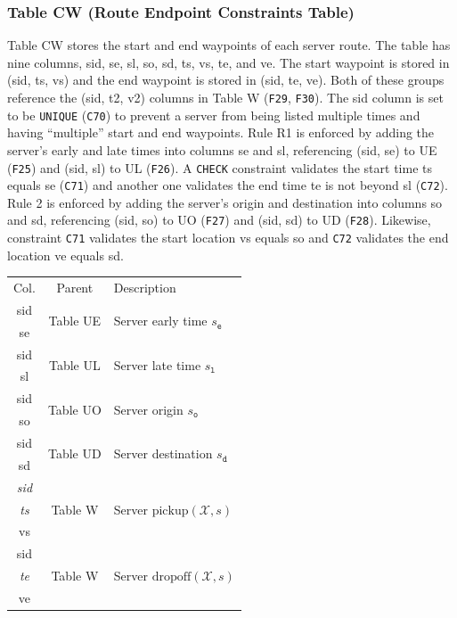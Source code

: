 \documentclass{article}
\theoremstyle{definition}
\begin{document}
\subsubsection{Table CW (Route Endpoint Constraints Table)}
Table CW stores the start and end waypoints of each server route.  The table
has nine columns, \textsf{sid}, \textsf{se}, \textsf{sl}, \textsf{so},
\textsf{sd}, \textsf{ts}, \textsf{vs}, \textsf{te}, and \textsf{ve}.  The start
waypoint is stored in (\textsf{sid}, \textsf{ts}, \textsf{vs}) and the end
waypoint is stored in (\textsf{sid}, \textsf{te}, \textsf{ve}). Both of these
groups reference the (\textsf{sid}, \textsf{t2}, \textsf{v2}) columns in Table
W ({\tt{}F29}, {\tt{}F30}).  The \textsf{sid} column is set to be \texttt{UNIQUE}
({\tt{}C70}) to prevent a server from being listed multiple times and having
``multiple'' start and end waypoints.  Rule R1 is enforced by adding the
server's early and late times into columns \textsf{se} and \textsf{sl},
referencing (\textsf{sid}, \textsf{se}) to UE ({\tt{}F25}) and (\textsf{sid},
\textsf{sl}) to UL ({\tt{}F26}).  A \texttt{CHECK} constraint validates the start
time \textsf{ts} equals \textsf{se} ({\tt{}C71}) and another one validates the end
time \textsf{te} is not beyond \textsf{sl} ({\tt{}C72}).  Rule 2 is enforced by
adding the server's origin and destination into columns \textsf{so} and
\textsf{sd}, referencing (\textsf{sid}, \textsf{so}) to UO ({\tt{}F27}) and
(\textsf{sid}, \textsf{sd}) to UD ({\tt{}F28}).  Likewise, constraint {\tt{}C71}
validates the start location \textsf{vs} equals \textsf{so} and {\tt{}C72}
validates the end location \textsf{ve} equals \textsf{sd}.
\begin{table}[h]
\centering
\small
\begin{tabular}{|c|c|l|}
\hline
\rowcolor{TableTitle}
\multicolumn{3}{|c|}{Table CW (Route Endpoint Constraints)}\\
\hline
\rowcolor{TableHeader}
Col. & Parent & Description\\
\hline
sid & \multirow{2}{*}{Table UE} & \multirow{2}{*}{Server early time $s_\texttt{e}$} \\
se & & \\
\hline
sid & \multirow{2}{*}{Table UL} & \multirow{2}{*}{Server late time $s_\texttt{l}$} \\
sl & & \\
\hline
sid & \multirow{2}{*}{Table UO} & \multirow{2}{*}{Server origin $s_\texttt{o}$} \\
so & &\\
\hline
sid & \multirow{2}{*}{Table UD} & \multirow{2}{*}{Server destination $s_\texttt{d}$} \\
sd & & \\
\hline
\textit{sid} & \multirow{3}{*}{Table W} & \multirow{3}{*}{Server $\textrm{pickup}(\mathcal{X},s)$}\\
\textit{ts} & & \\
vs & & \\
\hline
sid & \multirow{3}{*}{Table W} & \multirow{3}{*}{Server $\textrm{dropoff}(\mathcal{X},s)$}\\
\textit{te} & & \\
ve & & \\
\hline
\end{tabular}
\end{table}
\end{document}

